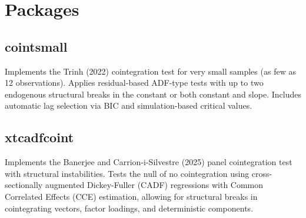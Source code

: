 \section{Packages}\label{packages}

\subsection{cointsmall}\label{cointsmall}

Implements the Trinh (2022) cointegration test for very small samples
(as few as 12 observations). Applies residual-based ADF-type tests with
up to two endogenous structural breaks in the constant or both constant
and slope. Includes automatic lag selection via BIC and simulation-based
critical values.

\begin{Shaded}
\begin{Highlighting}[]
\OtherTok{\textless{}{-}}  \NormalTok{, } \NormalTok{)}
\end{Highlighting}
\end{Shaded}

\subsection{xtcadfcoint}\label{xtcadfcoint}

Implements the Banerjee and Carrion-i-Silvestre (2025) panel
cointegration test with structural instabilities. Tests the null of no
cointegration using cross-sectionally augmented Dickey-Fuller (CADF)
regressions with Common Correlated Effects (CCE) estimation, allowing
for structural breaks in cointegrating vectors, factor loadings, and
deterministic components.

\begin{Shaded}
\begin{Highlighting}[]
\OtherTok{\textless{}{-}} \SpecialCharTok{\textasciitilde{}}\SpecialCharTok{+}
                       \NormalTok{, } \NormalTok{, } \NormalTok{)}
\end{Highlighting}
\end{Shaded}

